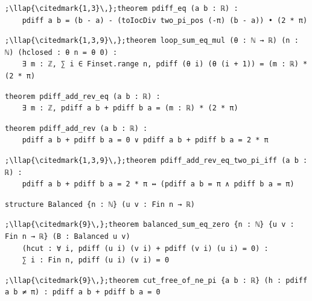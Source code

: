 \begin{lstlisting}[style=leancat]
;\llap{\citedmark{1,3}\,};theorem pdiff_eq (a b : ℝ) :
    pdiff a b = (b - a) - (toIocDiv two_pi_pos (-π) (b - a)) • (2 * π)
\end{lstlisting}

\begin{lstlisting}[style=leancat]
;\llap{\citedmark{1,3,9}\,};theorem loop_sum_eq_mul (θ : ℕ → ℝ) (n : ℕ) (hclosed : θ n = θ 0) :
    ∃ m : ℤ, ∑ i ∈ Finset.range n, pdiff (θ i) (θ (i + 1)) = (m : ℝ) * (2 * π)
\end{lstlisting}

\begin{lstlisting}[style=leancat]
theorem pdiff_add_rev_eq (a b : ℝ) :
    ∃ m : ℤ, pdiff a b + pdiff b a = (m : ℝ) * (2 * π)
\end{lstlisting}

\begin{lstlisting}[style=leancat]
theorem pdiff_add_rev (a b : ℝ) :
    pdiff a b + pdiff b a = 0 ∨ pdiff a b + pdiff b a = 2 * π
\end{lstlisting}

\begin{lstlisting}[style=leancat]
;\llap{\citedmark{1,3,9}\,};theorem pdiff_add_rev_eq_two_pi_iff (a b : ℝ) :
    pdiff a b + pdiff b a = 2 * π ↔ (pdiff a b = π ∧ pdiff b a = π)
\end{lstlisting}

\begin{lstlisting}[style=leancat]
structure Balanced {n : ℕ} (u v : Fin n → ℝ)
\end{lstlisting}

\begin{lstlisting}[style=leancat]
;\llap{\citedmark{9}\,};theorem balanced_sum_eq_zero {n : ℕ} {u v : Fin n → ℝ} (B : Balanced u v)
    (hcut : ∀ i, pdiff (u i) (v i) + pdiff (v i) (u i) = 0) :
    ∑ i : Fin n, pdiff (u i) (v i) = 0
\end{lstlisting}

\begin{lstlisting}[style=leancat]
;\llap{\citedmark{9}\,};theorem cut_free_of_ne_pi {a b : ℝ} (h : pdiff a b ≠ π) : pdiff a b + pdiff b a = 0
\end{lstlisting}

